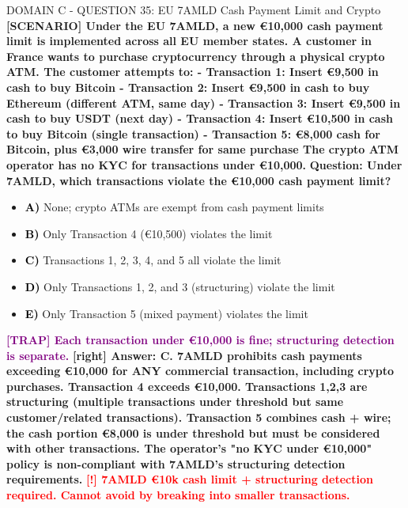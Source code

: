 \documentclass[11pt,a4paper]{beamer}
\newcommand{\redflag}[1]{\textcolor{red}{\textbf{[!] #1}}}
\newcommand{\trap}[1]{\textcolor{purple}{\textbf{[TRAP] #1}}}
\newcommand{\correct}[1]{\textcolor{green!50!black}{\textbf{[right] #1}}}
\newcommand{\scenario}[1]{\textcolor{blue!70!black}{\textbf{[SCENARIO] #1}}}
\newcommand{\option}[1]{\textcolor{black}{\textbf{#1}}}
\begin{document}
\begin{frame}{DOMAIN C - QUESTION 35: EU 7AMLD Cash Payment Limit and Crypto}
\scenario{Under the EU 7AMLD, a new €10,000 cash payment limit is implemented across all EU member states. A customer in France wants to purchase cryptocurrency through a physical crypto ATM. The customer attempts to:
- Transaction 1: Insert €9,500 in cash to buy Bitcoin
- Transaction 2: Insert €9,500 in cash to buy Ethereum (different ATM, same day)
- Transaction 3: Insert €9,500 in cash to buy USDT (next day)
- Transaction 4: Insert €10,500 in cash to buy Bitcoin (single transaction)
- Transaction 5: €8,000 cash for Bitcoin, plus €3,000 wire transfer for same purchase
The crypto ATM operator has no KYC for transactions under €10,000.}
\vspace{0.2cm}
\textbf{Question: Under 7AMLD, which transactions violate the €10,000 cash payment limit?}
\vspace{0.1cm}
\begin{itemize}
    \item \option{A)} None; crypto ATMs are exempt from cash payment limits
    \item \option{B)} Only Transaction 4 (€10,500) violates the limit
    \item \option{C)} Transactions 1, 2, 3, 4, and 5 all violate the limit
    \item \option{D)} Only Transactions 1, 2, and 3 (structuring) violate the limit
    \item \option{E)} Only Transaction 5 (mixed payment) violates the limit
\end{itemize}
\vspace{0.2cm}
\trap{Each transaction under €10,000 is fine; structuring detection is separate.}
\correct{Answer: C. 7AMLD prohibits cash payments exceeding €10,000 for ANY commercial transaction, including crypto purchases. Transaction 4 exceeds €10,000. Transactions 1,2,3 are structuring (multiple transactions under threshold but same customer/related transactions). Transaction 5 combines cash + wire; the cash portion €8,000 is under threshold but must be considered with other transactions. The operator's "no KYC under €10,000" policy is non-compliant with 7AMLD's structuring detection requirements.}
\redflag{7AMLD €10k cash limit + structuring detection required. Cannot avoid by breaking into smaller transactions.}
\end{frame}
\end{document}
